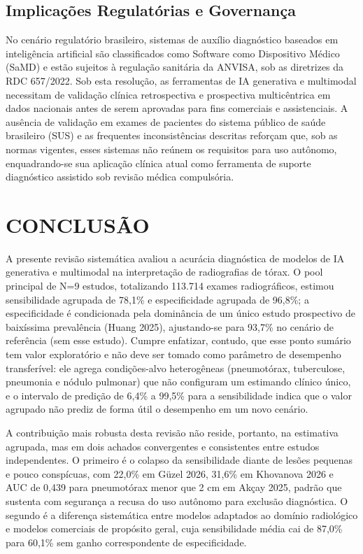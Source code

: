 \documentclass[12pt,a4paper]{article}
\begin{document}
\subsection{Implicações Regulatórias e Governança}
No cenário regulatório brasileiro, sistemas de auxílio diagnóstico baseados em inteligência artificial são classificados como Software como Dispositivo Médico (SaMD) e estão sujeitos à regulação sanitária da ANVISA, sob as diretrizes da RDC 657/2022. Sob esta resolução, as ferramentas de IA generativa e multimodal necessitam de validação clínica retrospectiva e prospectiva multicêntrica em dados nacionais antes de serem aprovadas para fins comerciais e assistenciais. A ausência de validação em exames de pacientes do sistema público de saúde brasileiro (SUS) e as frequentes inconsistências descritas reforçam que, sob as normas vigentes, esses sistemas não reúnem os requisitos para uso autônomo, enquadrando-se sua aplicação clínica atual como ferramenta de suporte diagnóstico assistido sob revisão médica compulsória.

\newpage
\section{CONCLUSÃO}
A presente revisão sistemática avaliou a acurácia diagnóstica de modelos de IA generativa e multimodal na interpretação de radiografias de tórax. O pool principal de N=9 estudos, totalizando 113.714 exames radiográficos, estimou sensibilidade agrupada de 78,1\% e especificidade agrupada de 96,8\%; a especificidade é condicionada pela dominância de um único estudo prospectivo de baixíssima prevalência (Huang 2025), ajustando-se para 93,7\% no cenário de referência (sem esse estudo). Cumpre enfatizar, contudo, que esse ponto sumário tem valor exploratório e não deve ser tomado como parâmetro de desempenho transferível: ele agrega condições-alvo heterogêneas (pneumotórax, tuberculose, pneumonia e nódulo pulmonar) que não configuram um estimando clínico único, e o intervalo de predição de 6,4\% a 99,5\% para a sensibilidade indica que o valor agrupado não prediz de forma útil o desempenho em um novo cenário.

A contribuição mais robusta desta revisão não reside, portanto, na estimativa agrupada, mas em dois achados convergentes e consistentes entre estudos independentes. O primeiro é o colapso da sensibilidade diante de lesões pequenas e pouco conspícuas, com 22,0\% em Güzel 2026, 31,6\% em Khovanova 2026 e AUC de 0,439 para pneumotórax menor que 2 cm em Akçay 2025, padrão que sustenta com segurança a recusa do uso autônomo para exclusão diagnóstica. O segundo é a diferença sistemática entre modelos adaptados ao domínio radiológico e modelos comerciais de propósito geral, cuja sensibilidade média cai de 87,0\% para 60,1\% sem ganho correspondente de especificidade.
\end{document}
